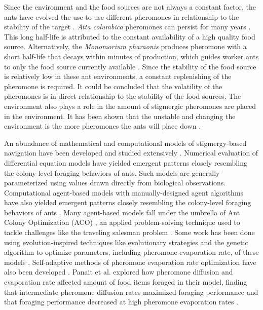Since the environment and the food sources are not always a constant factor, the ants have evolved the use to use  different pheromones in relationship to the stability of the target \cite{jeanson_pheromone_2003}.
\textit{Atta columbica} pheromones can persist for many years \cite{howard_costs_2001}.
This long half-life is attributed to the constant availability of a high quality food source.
Alternatively, the \textit{Monomorium pharaonis} produces pheromone with a short half-life that decays within minutes of production, which guides worker ants to only the food source currently available \cite{robinson_decay_2008}.
Since the stability of the food source is relatively low in these ant environments, a constant replenishing of the pheromone is required.
It could be concluded that the volatility of the pheromones is in direct relationship to the stability of the food sources.
The environment also plays a role in the amount of stigmergic pheromones are placed in the environment.
It has been shown that the unstable and changing the environment is the more pheromones the ants will place down \cite{czaczkes2015trail}.

An abundance of mathematical and computational models of stigmergy-based navigation have been developed and studied extensively \cite{perna2012individual, ryan2016model}.
Numerical evaluation of differential equation models have yielded emergent patterns closely resembling the colony-level foraging behaviors of ants.
Such models are generally parameterized using values drawn directly from biological observations.
Computational agent-based models with manually-designed agent algorithms have also yielded emergent patterns closely resembling the colony-level foraging behaviors of ants \cite{robinson2008agent, pratt2005agent}.
Many agent-based models fall under the umbrella of Ant Colony Optimization (ACO) \cite{dorigo1996ant}, an applied problem-solving technique used to tackle challenges like the traveling salesman problem \cite{dorigo1997ant, bianchi2002ant}.
Some work has been done using evolution-inspired techniques like evolutionary strategies and the genetic algorithm to optimize parameters, including pheromone evaporation rate, of these models \cite{kuyucu2012evolutionary, sauter2002evolving}.
Self-adaptive methods of pheromone evaporation rate optimization have also been developed \cite{mavrovouniotis2014ant, mavrovouniotis2013adapting}.
Panait et al. explored how pheromone diffusion and evaporation rate affected amount of food items foraged in their model, finding that intermediate pheromone diffusion rates maximized foraging performance and that foraging performance decreased at high pheromone evaporation rates \cite{panait2004ant}.

